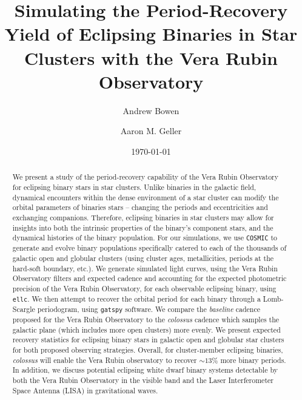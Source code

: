\documentclass[twocolumn]{aastex63}
\date{\today}
\begin{document}
\title{Simulating the Period-Recovery Yield of Eclipsing Binaries in Star Clusters with the Vera Rubin Observatory}


\author{Andrew Bowen}

\author{Aaron M. Geller}



\begin{abstract}
We present a study of the period-recovery capability of the Vera Rubin Observatory for eclipsing binary stars in star clusters. Unlike binaries in the galactic field, dynamical encounters within the dense environment of a star cluster can modify the orbital parameters of binaries stars -- changing the periods and eccentricities and exchanging companions. Therefore, eclipsing binaries in star clusters may allow for insights into both the intrinsic properties of the binary’s component stars, and the dynamical histories of the binary population. For our simulations, we use \texttt{COSMIC} to generate and evolve binary populations specifically catered to each of the thousands of galactic open and globular clusters (using cluster ages, metallicities, periods at the hard-soft boundary, etc.). We generate simulated light curves, using the Vera Rubin Observatory filters and expected cadence and accounting for the expected photometric precision of the Vera Rubin Observatory, for each observable eclipsing binary, using \texttt{ellc}. We then attempt to recover the orbital period for each binary through a Lomb-Scargle periodogram, using \texttt{gatspy} software. We compare the \textit{baseline} cadence proposed for the Vera Rubin Observatory to the \textit{colossus} cadence which samples the galactic plane (which includes more open clusters) more evenly. We present expected recovery statistics for eclipsing binary stars in galactic open and globular star clusters for both proposed observing strategies. Overall, for cluster-member eclipsing binaries, \textit{colossus} will enable the Vera Rubin observatory to recover $\sim 13\%$ more binary periods. In addition, we discuss potential eclipsing white dwarf binary systems detectable by both the Vera Rubin Observatory in the visible band and the Laser Interferometer Space Antenna (LISA) in gravitational waves. 

\end{abstract}
\end{document}
